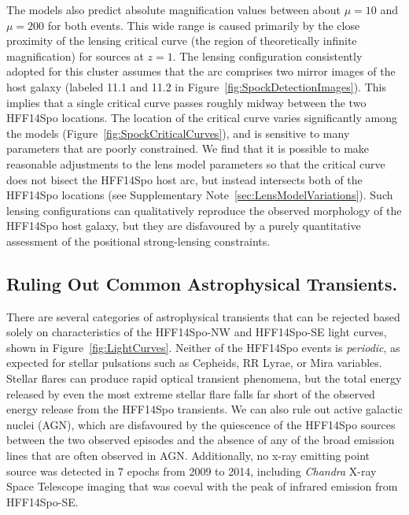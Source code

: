 \documentclass{article}
\def\Chandra{{\it Chandra}\xspace}
\def\spock{HFF14Spo\xspace}
\def\spockone{HFF14Spo-NW\xspace}
\def\spocktwo{HFF14Spo-SE\xspace}
\begin{document}
The models also predict absolute magnification values between about
$\mu=10$ and $\mu=200$ for both events. This wide range is caused
primarily by the close proximity of the lensing critical curve (the
region of theoretically infinite magnification) for sources at $z=1$.
The lensing configuration consistently adopted for this cluster
assumes that the arc comprises two mirror images of the host galaxy
(labeled 11.1 and 11.2 in
Figure~\ref{fig:SpockDetectionImages})\cite{Zitrin:2013a, Jauzac:2014,
  Johnson:2014, Richard:2014, Diego:2015a, Grillo:2015, Hoag:2016,
  Sebesta:2016, Caminha:2017}.  This implies that a single critical
curve passes roughly midway between the two \spock locations.  The
location of the critical curve varies significantly among the models
(Figure~\ref{fig:SpockCriticalCurves}), and is sensitive to many
parameters that are poorly constrained. We find that it is possible to
make reasonable adjustments to the lens model parameters so that the
critical curve does not bisect the \spock host arc, but instead
intersects both of the \spock locations (see Supplementary
Note~\ref{sec:LensModelVariations}).  Such lensing configurations can
qualitatively reproduce the observed morphology of the \spock host
galaxy, but they are disfavoured by a purely quantitative assessment of
the positional strong-lensing constraints.

\subsection{Ruling Out Common Astrophysical Transients.}

There are several categories of astrophysical transients that can be
rejected based solely on characteristics of the \spockone and
\spocktwo light curves, shown in Figure~\ref{fig:LightCurves}. Neither
of the \spock events is {\it periodic}, as expected for stellar
pulsations such as Cepheids, RR Lyrae, or Mira variables. Stellar
flares can produce rapid optical transient phenomena, but the total
energy released by even the most extreme stellar
flare\cite{Karoff:2016} falls far short of the observed energy release
from the \spock transients. We can also rule out active galactic
nuclei (AGN), which are disfavoured by the quiescence of the \spock
sources between the two observed episodes and the absence of any of
the broad emission lines that are often observed in AGN.
Additionally, no x-ray emitting point source was detected in 7 epochs
from 2009 to 2014, including \Chandra X-ray Space Telescope imaging
that was coeval with the peak of infrared emission from \spocktwo.
\end{document}
